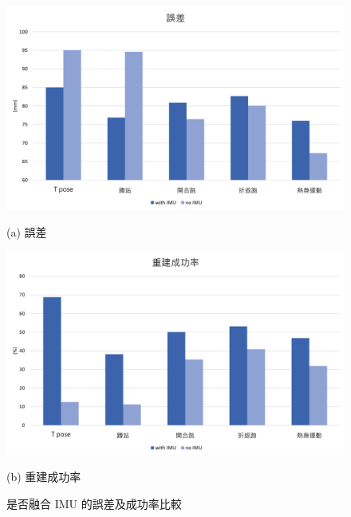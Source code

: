 \begin{figure}[!ht]
   \centering
   \begin{minipage}{\textwidth}
     \centering
     \includegraphics[width=\linewidth]{figure/ch4_fig_error.png}
     \caption*{(a) 誤差}
   \end{minipage}
   \begin{minipage}{\textwidth}
      \centering
      \includegraphics[width=\linewidth]{figure/ch4_fig_success.png}
      \caption*{(b) 重建成功率}
   \end{minipage}
   \caption[是否融合 IMU 的誤差及成功率比較]{是否融合 IMU 的誤差及成功率比較}
   \label{ch4_fig_error_success}
\end{figure}

\clearpage

